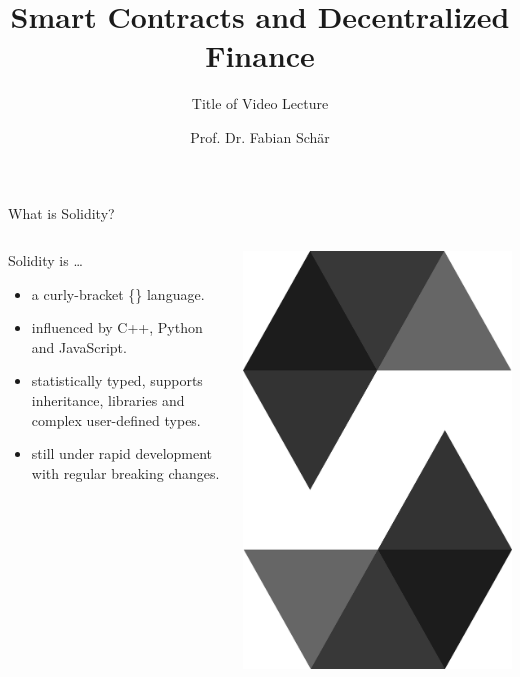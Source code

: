 \documentclass[]{beamer}
\title{Smart Contracts and Decentralized Finance}
\subtitle{Title of Video Lecture}
\author{Prof. Dr. Fabian Schär}
\institute{University of Basel}
\begin{document}
\thispagestyle{empty}
\begin{frame}[noframenumbering]
	\titlepage
\end{frame}

\begin{frame}{What is Solidity?}

\begin{columns}[T]
	\begin{column}{0.7\textwidth}
		Solidity is \dots
			\begin{itemize}
				\item<1-> a curly-bracket \{\} language.
				\item<2-> influenced by C++, Python and JavaScript.
				\item<3-> statistically typed, supports inheritance, libraries and complex user-defined types.
				\item<4-> still under rapid development with regular breaking changes.
			\end{itemize}
	\end{column}
	\begin{column}{0.3\textwidth}
	\center
			\includegraphics[scale=0.04]{../assets/images/solidity_logo_new}
	\end{column}
\end{columns}	


\end{frame}
\end{document}
